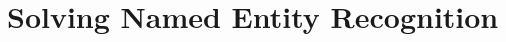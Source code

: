 \documentclass[10pt,xcolor=table]{beamer}
\begin{document}
%
%

\section[Applications to NLP]{Solving Named Entity Recognition}
\end{document}
